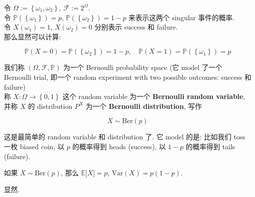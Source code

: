 \begin{example}

令 \(\Omega := \left\{ {\mathit{\omega}_{1},\mathit{\omega}_{2}} \right\}\), \(\mathcal{F} := 2^{\Omega}\).\\
令 \(\mathbb{P}(\left\{ \mathit{\omega}_{1} \right\}) = \mathit{p}\), \(\mathbb{P}(\left\{ \mathit{\omega}_{2} \right\}) = 1 - \mathit{p}\) 来表示这两个 singular 事件的概率.\\
令 \(\mathit{X}(\mathit{\omega}_{1}) = 1\), \(\mathit{X}(\mathit{\omega}_{2}) = 0\) 分别表示 success 和 failure.\\
那么显然可以计算:

\[\mathbb{P}(\mathit{X} = 0) = \mathbb{P}(\left\{ \mathit{\omega}_{2} \right\}) = 1 - \mathit{p},\quad\mathbb{P}(\mathit{X} = 1) = \mathbb{P}(\left\{ \mathit{\omega}_{1} \right\}) = \mathit{p}\]

我们称 \((\Omega,\mathcal{F},\mathbb{P})\) 为一个 Bernoulli probability space (它 model 了一个 Bernoulli trial, 即一个 random experiment with two possible outcomes: success 和 failure)\\
称 \(\mathit{X}:\Omega\rightarrow\left\{ {0,1} \right\}\) 这个 random variable 为一个 \textbf{Bernoulli random variable}, 并称 \(\mathit{X}\) 的 distribution \(\mathit{P}^{\mathit{X}}\) 为一个 \textbf{Bernoulli distribution}, 写作

\[\mathit{X} \sim \text{Ber}(\mathit{p})\]

这是最简单的 random variable 和 distribution 了. 它 model 的是: 比如我们 toss 一枚 biased coin, 以 \(\mathit{p}\) 的概率得到 heads (success), 以 \(1 - \mathit{p}\) 的概率得到 tails (failure).\\

\end{example}

\begin{proposition}

如果 \(\mathit{X} \sim \text{Ber}(\mathit{p})\), 那么 \(\mathbb{E}\lbrack\mathit{X}\rbrack = \mathit{p}\), \(\text{Var}(\mathit{X}) = \mathit{p}(1 - \mathit{p})\).

\end{proposition}

显然.

